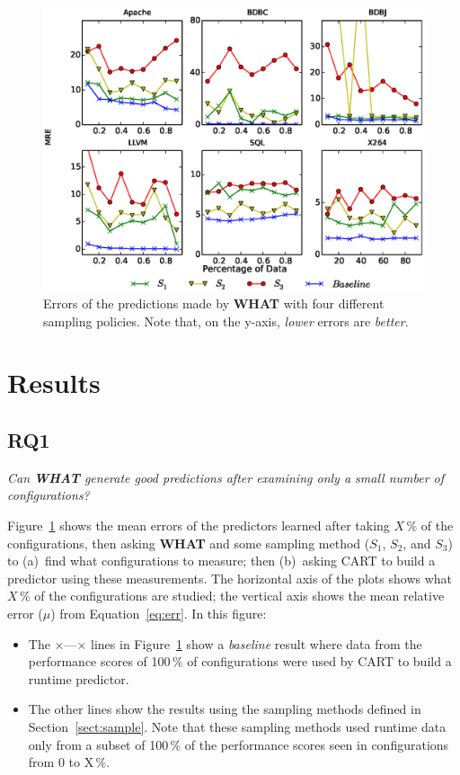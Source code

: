 \documentclass[smallextended]{svjour3}       %
\newcommand{\fig}[1]{Figure~\ref{fig:#1}}
\newcommand{\eq}[1]{Equation~\ref{eq:#1}}
\newcommand{\what}{{\bf WHAT}\xspace}
\begin{document}
\begin{figure}[t]
\centering
\includegraphics[width=\columnwidth]{Figures/SamplingAccuracy}
\caption{Errors of the predictions made by \what with four different
sampling policies. Note that, on the y-axis,  {\em lower} errors are {\em better}.
}
\label{fig:sampling_accuracy}
\end{figure}

\section{Results}
\subsection{RQ1}

\begin{center}
{\em Can  \what generate good predictions after
examining only a small number of configurations?}
\end{center}

\noindent \fig{sampling_accuracy} shows the mean errors of the predictors learned
after taking $X$\,\% of the configurations, then asking  \what and some sampling method ($S_1$, $S_2$, and $S_3$)
to (a)~find what configurations to measure; then (b)~asking CART to build a predictor
using these measurements. The horizontal axis of the plots shows what $X$\,\%
of the configurations are studied; the vertical axis shows the mean relative error ($\mu$) from \eq{err}.
In this figure:
\begin{itemize}
\item
The $\times$\hspace{-2pt}---\hspace{-2pt}$\times$ lines in \fig{sampling_accuracy} show a {\em baseline} result
where data from the performance scores of 100\,\% of  configurations were used by CART
to build a runtime predictor.
\item
The other lines show the results using the sampling methods defined in Section~\ref{sect:sample}.
Note that these sampling methods used  runtime data only from a
subset of 100\,\% of the performance scores seen in configurations
from 0 to X\,\%.
\end{itemize}
\end{document}
